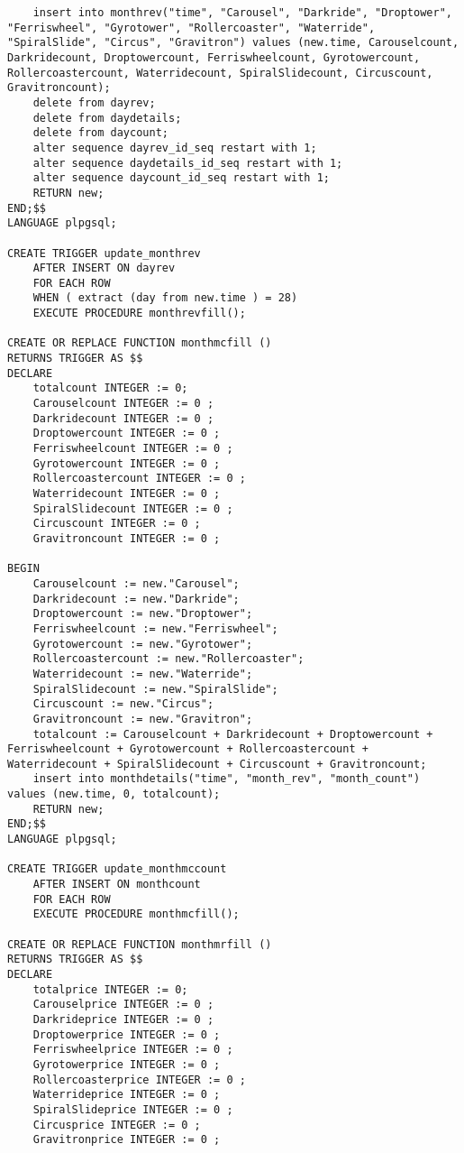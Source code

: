\begin{lstlisting}
    insert into monthrev("time", "Carousel", "Darkride", "Droptower", "Ferriswheel", "Gyrotower", "Rollercoaster", "Waterride", "SpiralSlide", "Circus", "Gravitron") values (new.time, Carouselcount, Darkridecount, Droptowercount, Ferriswheelcount, Gyrotowercount, Rollercoastercount, Waterridecount, SpiralSlidecount, Circuscount, Gravitroncount);
    delete from dayrev;
    delete from daydetails;
    delete from daycount;
    alter sequence dayrev_id_seq restart with 1;
    alter sequence daydetails_id_seq restart with 1;
    alter sequence daycount_id_seq restart with 1;
    RETURN new;
END;$$
LANGUAGE plpgsql;

CREATE TRIGGER update_monthrev
    AFTER INSERT ON dayrev
    FOR EACH ROW
    WHEN ( extract (day from new.time ) = 28)
    EXECUTE PROCEDURE monthrevfill();

CREATE OR REPLACE FUNCTION monthmcfill ()
RETURNS TRIGGER AS $$
DECLARE
    totalcount INTEGER := 0;
    Carouselcount INTEGER := 0 ;
    Darkridecount INTEGER := 0 ;
    Droptowercount INTEGER := 0 ;
    Ferriswheelcount INTEGER := 0 ;
    Gyrotowercount INTEGER := 0 ;
    Rollercoastercount INTEGER := 0 ;
    Waterridecount INTEGER := 0 ;
    SpiralSlidecount INTEGER := 0 ;
    Circuscount INTEGER := 0 ;
    Gravitroncount INTEGER := 0 ;

BEGIN
    Carouselcount := new."Carousel";
    Darkridecount := new."Darkride";
    Droptowercount := new."Droptower";
    Ferriswheelcount := new."Ferriswheel";
    Gyrotowercount := new."Gyrotower";
    Rollercoastercount := new."Rollercoaster";
    Waterridecount := new."Waterride";
    SpiralSlidecount := new."SpiralSlide";
    Circuscount := new."Circus";
    Gravitroncount := new."Gravitron";
    totalcount := Carouselcount + Darkridecount + Droptowercount + Ferriswheelcount + Gyrotowercount + Rollercoastercount + Waterridecount + SpiralSlidecount + Circuscount + Gravitroncount;
    insert into monthdetails("time", "month_rev", "month_count") values (new.time, 0, totalcount);
    RETURN new;
END;$$
LANGUAGE plpgsql;

CREATE TRIGGER update_monthmccount
    AFTER INSERT ON monthcount
    FOR EACH ROW
    EXECUTE PROCEDURE monthmcfill();

CREATE OR REPLACE FUNCTION monthmrfill ()
RETURNS TRIGGER AS $$
DECLARE
    totalprice INTEGER := 0;
    Carouselprice INTEGER := 0 ;
    Darkrideprice INTEGER := 0 ;
    Droptowerprice INTEGER := 0 ;
    Ferriswheelprice INTEGER := 0 ;
    Gyrotowerprice INTEGER := 0 ;
    Rollercoasterprice INTEGER := 0 ;
    Waterrideprice INTEGER := 0 ;
    SpiralSlideprice INTEGER := 0 ;
    Circusprice INTEGER := 0 ;
    Gravitronprice INTEGER := 0 ;


\end{lstlisting}

